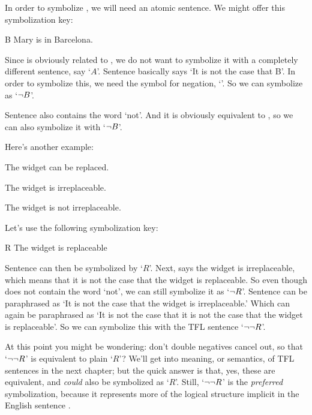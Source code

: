 In order to symbolize , we will need an atomic sentence. We might offer this symbolization key:

	\begin{ekey}
		\item[B] Mary is in Barcelona.
	\end{ekey}

Since  is obviously related to , we do not want to symbolize it with a completely different sentence, say `$A$'. Sentence  basically says `It is not the case that B'. In order to symbolize this, we need the symbol for negation, `\enot'. So we can symbolize  as `$\neg B$'.

Sentence  also contains the word `not'. And it is obviously equivalent to , so we can also symbolize it with `$\neg B$'.

Here's another example:

	\begin{earg}
		\item[\ex{not4}] The widget can be replaced.
		\item[\ex{not5}] The widget is irreplaceable.
		\item[\ex{not5b}] The widget is not irreplaceable.
	\end{earg}

Let's use the following symbolization key:

	\begin{ekey}
		\item[R] The widget is replaceable
	\end{ekey}

Sentence  can then be symbolized by `$R$'. Next,  says the widget is irreplaceable, which means that it is not the case that the widget is replaceable. So even though  does not contain the word `not', we can still symbolize it as `$\neg R$'.  Sentence  can be paraphrased as `It is not the case that the widget is irreplaceable.' Which can again be paraphrased as `It is not the case that it is not the case that the widget is replaceable'. So we can symbolize this with the TFL sentence `$\neg\neg R$'.

At this point you might be wondering: don't double negatives cancel out, so that `$\neg\neg R$' is equivalent to plain `$R$'? We'll get into meaning, or semantics, of TFL sentences in the next chapter; but the quick answer is that, yes, these are equivalent, and  \emph{could} also be symbolized as `$R$'.  Still, `$\neg \neg R$' is the \emph{preferred} symbolization, because it represents more of the logical structure implicit in the English sentence .

